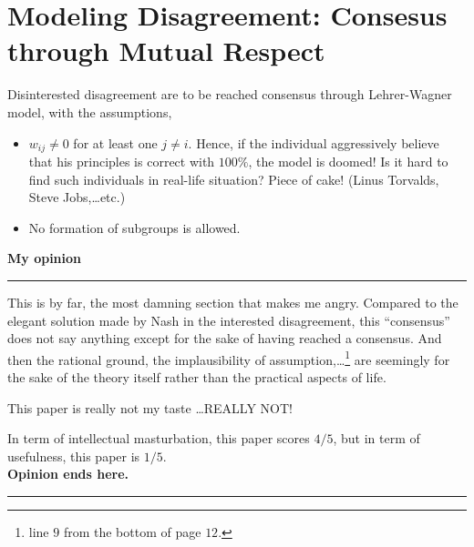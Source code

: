 \documentclass[a4paper,11pt]{article}
\newcommand{\bold}[1]{\textbf{#1}}
\begin{document}
  \section{Modeling Disagreement: Consesus through
  Mutual Respect}
  Disinterested disagreement are to be reached consensus
  through Lehrer-Wagner model, with the assumptions,
  \begin{itemize}
    \item $w_{ij} \neq 0$ for at least one $j\neq i$.
    Hence, if the individual aggressively believe that
    his principles is correct with $100\%$, the model
    is doomed! Is it hard to find such individuals in
    real-life situation? Piece of cake!
    (Linus Torvalds,
    Steve Jobs,\dots etc.)
    \item No formation of subgroups is allowed.
  \end{itemize}

  \medskip
  \bold{My opinion}\rule{10cm}{0.4pt}
  This is by far, the most damning section that makes me
  angry. Compared to the elegant solution made by Nash
  in the interested disagreement, this ``consensus''
  does not say anything except for the sake of having
  reached a consensus. And then the rational ground,
  the implausibility of assumption,\dots \footnote{
  line $9$ from the bottom of page $12$.}
  are seemingly for the sake of the theory itself
  rather than the practical aspects of life.

  This paper is really not my taste \ldots REALLY NOT!

  In term of intellectual masturbation, this paper scores
  $4/5$, but in term of usefulness, this paper is $1/5$.
  \\
  \bold{Opinion ends here.}\rule{10cm}{0.4pt}
\end{document}
